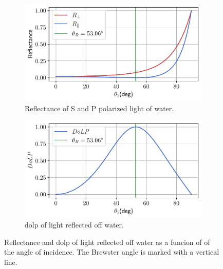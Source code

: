 \begin{figure}[H]
    \centering
    \begin{subfigure}{.5\textwidth}
        \centering
        \includegraphics[width=\textwidth]{figures/pol_plots/brewster0.pdf}
        \caption{Reflectance of S and P polarized light of water.}
        \label{fig:brewster0}
    \end{subfigure}%
    \begin{subfigure}{.5\textwidth}
        \centering
        \includegraphics[width=\textwidth]{figures/pol_plots/brewster1.pdf}
        \caption{\gls{dolp} of light reflected off water.}
        \label{fig:brewster1}
    \end{subfigure}
    \caption{Reflectance and \gls{dolp} of light reflected off water as a funcion of of the angle of incidence.
        The Brewster angle is marked with a vertical line.}
    \label{fig:test}
\end{figure}




